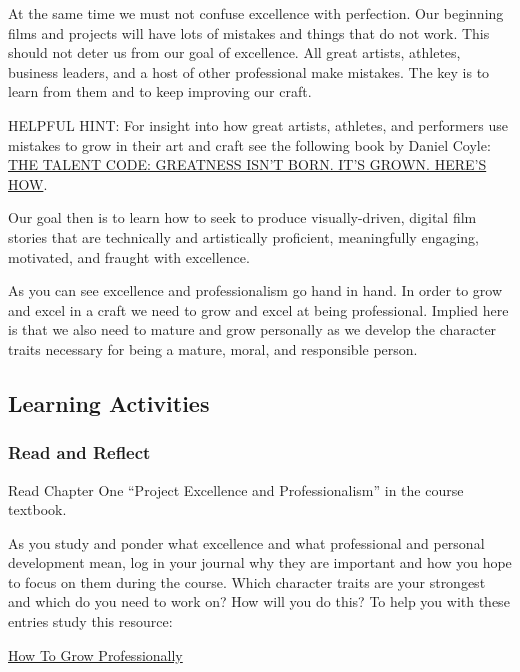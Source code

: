 \documentclass[
]{book}
\begin{document}
At the same time we must not confuse excellence with perfection. Our beginning films and projects will have lots of mistakes and things that do not work. This should not deter us from our goal of excellence. All great artists, athletes, business leaders, and a host of other professional make mistakes. The key is to learn from them and to keep improving our craft.

HELPFUL HINT: For insight into how great artists, athletes, and performers use mistakes to grow in their art and craft see the following book by Daniel Coyle: \href{http://danielcoyle.com/the-talent-code/}{THE TALENT CODE: GREATNESS ISN'T BORN. IT'S GROWN. HERE'S HOW}.

Our goal then is to learn how to seek to produce visually-driven, digital film stories that are technically and artistically proficient, meaningfully engaging, motivated, and fraught with excellence.

As you can see excellence and professionalism go hand in hand. In order to grow and excel in a craft we need to grow and excel at being professional. Implied here is that we also need to mature and grow personally as we develop the character traits necessary for being a mature, moral, and responsible person.

\hypertarget{learning-activities-1}{%
\subsection*{Learning Activities}\label{learning-activities-1}}

\begin{reflect}
\hypertarget{read-and-reflect}{%
\subsubsection*{Read and Reflect}\label{read-and-reflect}}

Read Chapter One ``Project Excellence and Professionalism'' in the course textbook.

As you study and ponder what excellence and what professional and personal development mean, log in your journal why they are important and how you hope to focus on them during the course. Which character traits are your strongest and which do you need to work on? How will you do this? To help you with these entries study this resource:

\href{https://brandyourself.com/blog/guide/how-to-grow-professionally/}{How To Grow Professionally}
\end{reflect}
\end{document}
